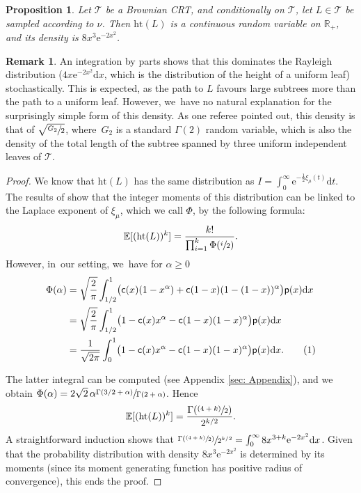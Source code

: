\documentclass[11pt]{article}
\newcommand{\psfrac}[2]{\sfrac{(#1)}{#2}}
\newcommand{\pp}{\mathsf{p}}
\newcommand{\R}{{\mathbb{R}}}
\newcommand{\T}{\mathcal{T}}\let\CRT\T\let\tbr\T
\newcommand\numberthis{\addtocounter{equation}{1}\tag{\theequation}}
\newcommand{\dd}{\mathrm{d}}
\newcommand{\h}{\mathrm{ht}}
\newtheorem{prop}[thm]{Proposition}
\theoremstyle{definition}
\newtheorem{rem}[thm]{Remark}
\begin{document}
\begin{prop}\label{prop:hd} Let $ \T$ be a Brownian CRT, and conditionally on $\T$, let $ L \in \T$ be sampled according to $\nu$. Then $ \mathrm{ht}(L)$ is a continuous random variable on $\R_+$, and its density is $8x^3\mathrm{e}^{-2x^2}$.
\end{prop}

\begin{rem} An integration by parts shows that this dominates the Rayleigh distribution ($4x\mathrm{e}^{-2x^2} \dd x$, which is the distribution of the height of a uniform leaf) stochastically. This is expected, as the path to $L$ favours large subtrees more than the path to a uniform leaf. However, we~have no natural explanation for the surprisingly simple form of this density. As one referee pointed out, this density is that of $\sqrt{\sfrac{G_2}{2}}$, where~$G_2$ is a standard $\Gamma(2)$ random variable, which is also the density of the total length of the subtree spanned by three uniform independent leaves of $\T$.
\end{rem}

\begin{proof}
We know that $\h(L)$ has the same distribution as $I=\int_{0}^{\infty}\mathrm{e}^{-\frac12 \xi_\mu(t)}\mathrm{d}t$.
The results of \cite{Carmona/Petit/Yor} show that the integer moments of this distribution can be linked to the Laplace exponent of $\xi_\mu$, which we call $\Phi$, by the following formula:
\[
\mathbb{E}[(\mathrm{ht}(L))^k]=\frac{k!}{\prod_{i=1}^k \Phi(\sfrac{i}{2})}.
\]
However, in~our setting, we~have for $\alpha\geq 0$
\begin{align*}\Phi(\alpha)&=\sqrt{\frac{2}{\pi}}\int_{1/2}^{1}\bigl(\ff(x)(1-x^{\alpha})+\ff(1-x)(1-(1-x))^{\alpha}\bigr)\pp(x)\dd x \\
&=\sqrt{\frac{2}{\pi}}\int_{1/2}^{1}\bigl(1-\ff(x)x^{\alpha}-\ff(1-x)(1-x)^{\alpha}\bigr)\pp(x)\dd x\\
&=\frac1{\sqrt{2\pi}}\int_{0}^{1}\bigl(1-\ff(x)x^{\alpha}-\ff(1-x)(1-x)^{\alpha}\bigr)\pp(x)\dd x.\numberthis \label{leafheightintegral}
\end{align*}

The latter integral can be computed (see Appendix \ref{sec: Appendix}), and we obtain $\Phi(\alpha)=2\sqrt{2}\,\alpha\sfrac{\Gamma(3/2+\alpha)}{\Gamma(2+\alpha)}$. Hence
\[
\mathbb{E}[(\mathrm{ht}(L))^k]=\frac{\Gamma(\psfrac{4+k}{2})}{2^{k/2}}.
\]
A straightforward induction shows that $\sfrac{\Gamma(\psfrac{4+k}{2})}{2^{k/2}}=\int_0^{\infty} 8x^{3+k}\mathrm{e}^{-2x^2} \mathrm{d}x$. Given that the probability distribution with density $8x^3\mathrm{e}^{-2x^2}$ is determined by its moments (since its moment generating function has positive radius of convergence), this ends the proof.
\end{proof}
\end{document}

